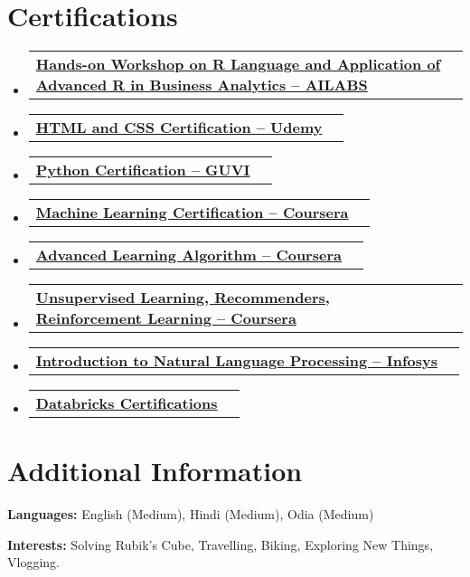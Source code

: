 \documentclass[a4paper,11pt]{article}
\makeatletter
\newcommand{\resumePOR}[3]{
\vspace{0.5mm}\item
    \begin{tabular*}{0.97\textwidth}[t]{l@{\extracolsep{\fill}}r}
        \textbf{#1}\hspace{0.3mm}#2 & \textit{\small{#3}} 
    \end{tabular*}
    \vspace{-2mm}
}
\newcommand{\resumeSubHeadingListStart}{\begin{itemize}[leftmargin=*,labelsep=1mm]}
\newcommand{\resumeSubHeadingListEnd}{\end{itemize}\vspace{2mm}}
\makeatother
\begin{document}
\section{\textbf{Certifications}}
\vspace{-0.2mm}
\resumeSubHeadingListStart

\resumePOR
  {\href{https://portfolio-wheat-nine-42.vercel.app/certificate.html}
  {\textbf{Hands-on Workshop on R Language and Application of Advanced R in Business Analytics – AILABS}}}
  {}
  {}
\resumePOR
  {\href{https://portfolio-wheat-nine-42.vercel.app/certificate.html}
  {\textbf{HTML and CSS Certification – Udemy}}}
  {}
{}
\resumePOR
  {\href{https://portfolio-wheat-nine-42.vercel.app/certificate.html}
  {\textbf{Python Certification – GUVI}}}
  {}
{}
\resumePOR
  {\href{https://portfolio-wheat-nine-42.vercel.app/certificate.html}
  {\textbf{Machine Learning Certification – Coursera}}}
  {}
{}
\resumePOR
  {\href{https://portfolio-wheat-nine-42.vercel.app/certificate.html}
  {\textbf{Advanced Learning Algorithm – Coursera}}}
  {}
{}
\resumePOR
  {\href{https://portfolio-wheat-nine-42.vercel.app/certificate.html}
  {\textbf{Unsupervised Learning, Recommenders, Reinforcement Learning – Coursera}}}
  {}
{}
\resumePOR
  {\href{https://portfolio-wheat-nine-42.vercel.app/certificate.html}
  {\textbf{Introduction to Natural Language Processing – Infosys}}}
  {}
{}
\resumePOR
  {\href{https://www.credential.net/profile/laxminarayansahu193675/wallet}
  {\textbf{Databricks Certifications}}}
  {}
{}
\resumeSubHeadingListEnd



\vspace{-4mm}

\section{\textbf{Additional Information}}
\vspace{-0.4mm}
\small{
\textbf{Languages:} English (Medium), Hindi (Medium), Odia (Medium)

\textbf{Interests:} Solving Rubik's Cube, Travelling, Biking, Exploring New Things, Vlogging.
}
\vspace{-4mm}
\end{document}
